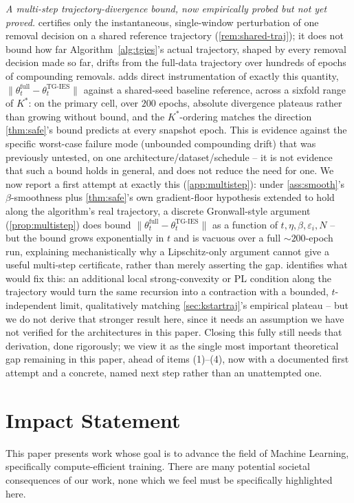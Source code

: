 \documentclass{article}
\theoremstyle{plain}
\theoremstyle{definition}
\theoremstyle{remark}
\begin{document}
\emph{A multi-step trajectory-divergence bound, now empirically probed but not yet proved.}  certifies only the instantaneous, single-window perturbation of one removal decision on a shared reference trajectory (\cref{rem:shared-traj}); it does not bound how far Algorithm~\ref{alg:tgies}'s actual trajectory, shaped by every removal decision made so far, drifts from the full-data trajectory over hundreds of epochs of compounding removals.  adds direct instrumentation of exactly this quantity, $\|\theta_t^{\mathrm{full}}-\theta_t^{\mathrm{TG\text{-}IES}}\|$ against a shared-seed baseline reference, across a sixfold range of $K^*$: on the primary cell, over $200$ epochs, absolute divergence plateaus rather than growing without bound, and the $K^*$-ordering matches the direction \cref{thm:safe}'s bound predicts at every snapshot epoch. This is evidence against the specific worst-case failure mode (unbounded compounding drift) that was previously untested, on one architecture/dataset/schedule -- it is not evidence that such a bound holds in general, and does not reduce the need for one. We now report a first attempt at exactly this (\cref{app:multistep}): under \cref{ass:smooth}'s $\beta$-smoothness plus \cref{thm:safe}'s own gradient-floor hypothesis extended to hold along the algorithm's real trajectory, a discrete Gronwall-style argument (\cref{prop:multistep}) does bound $\|\theta_t^{\mathrm{full}}-\theta_t^{\mathrm{TG\text{-}IES}}\|$ as a function of $t,\eta,\beta,\varepsilon_i,N$ -- but the bound grows exponentially in $t$ and is vacuous over a full $\sim\!200$-epoch run, explaining mechanistically why a Lipschitz-only argument cannot give a useful multi-step certificate, rather than merely asserting the gap.  identifies what would fix this: an additional local strong-convexity or PL condition along the trajectory would turn the same recursion into a contraction with a bounded, $t$-independent limit, qualitatively matching \cref{sec:kstartraj}'s empirical plateau -- but we do not derive that stronger result here, since it needs an assumption we have not verified for the architectures in this paper. Closing this fully still needs that derivation, done rigorously; we view it as the single most important theoretical gap remaining in this paper, ahead of items (1)--(4), now with a documented first attempt and a concrete, named next step rather than an unattempted one.

\section*{Impact Statement}
This paper presents work whose goal is to advance the field of Machine Learning, specifically compute-efficient training. There are many potential societal consequences of our work, none which we feel must be specifically highlighted here.
\end{document}
